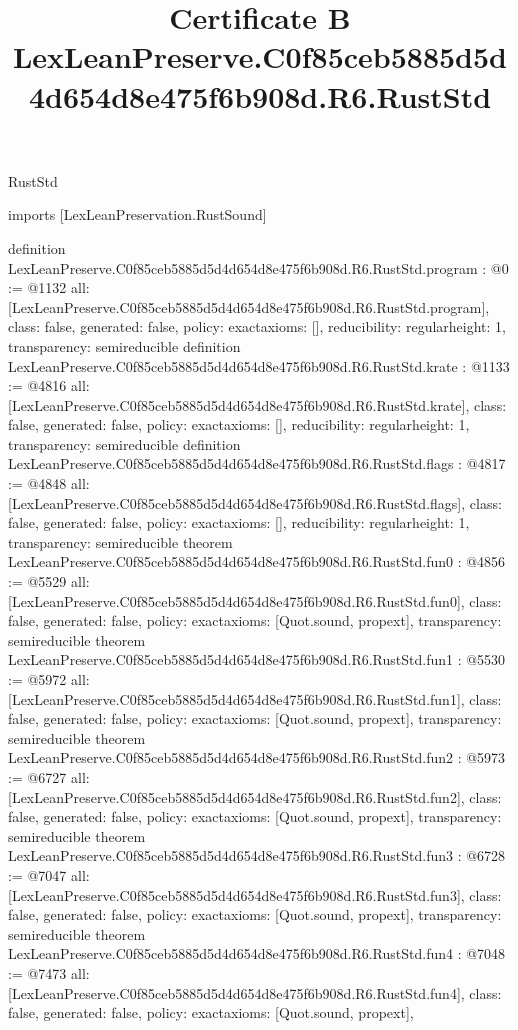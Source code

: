 \begin{lexlean}{RustStd}
\title{Certificate B LexLeanPreserve.C0f85ceb5885d5d4d654d8e475f6b908d.R6.RustStd}
\begin{coremodule}
imports [LexLeanPreservation.RustSound]

definition LexLeanPreserve.C0f85ceb5885d5d4d654d8e475f6b908d.R6.RustStd.program : @0 := @1132 {
  all: [LexLeanPreserve.C0f85ceb5885d5d4d654d8e475f6b908d.R6.RustStd.program],
  class: false,
  generated: false,
  policy: exact{axioms: []},
  reducibility: regular{height: 1},
  transparency: semireducible
}
definition LexLeanPreserve.C0f85ceb5885d5d4d654d8e475f6b908d.R6.RustStd.krate : @1133 := @4816 {
  all: [LexLeanPreserve.C0f85ceb5885d5d4d654d8e475f6b908d.R6.RustStd.krate],
  class: false,
  generated: false,
  policy: exact{axioms: []},
  reducibility: regular{height: 1},
  transparency: semireducible
}
definition LexLeanPreserve.C0f85ceb5885d5d4d654d8e475f6b908d.R6.RustStd.flags : @4817 := @4848 {
  all: [LexLeanPreserve.C0f85ceb5885d5d4d654d8e475f6b908d.R6.RustStd.flags],
  class: false,
  generated: false,
  policy: exact{axioms: []},
  reducibility: regular{height: 1},
  transparency: semireducible
}
theorem LexLeanPreserve.C0f85ceb5885d5d4d654d8e475f6b908d.R6.RustStd.fun0 : @4856 := @5529 {
  all: [LexLeanPreserve.C0f85ceb5885d5d4d654d8e475f6b908d.R6.RustStd.fun0],
  class: false,
  generated: false,
  policy: exact{axioms: [Quot.sound, propext]},
  transparency: semireducible
}
theorem LexLeanPreserve.C0f85ceb5885d5d4d654d8e475f6b908d.R6.RustStd.fun1 : @5530 := @5972 {
  all: [LexLeanPreserve.C0f85ceb5885d5d4d654d8e475f6b908d.R6.RustStd.fun1],
  class: false,
  generated: false,
  policy: exact{axioms: [Quot.sound, propext]},
  transparency: semireducible
}
theorem LexLeanPreserve.C0f85ceb5885d5d4d654d8e475f6b908d.R6.RustStd.fun2 : @5973 := @6727 {
  all: [LexLeanPreserve.C0f85ceb5885d5d4d654d8e475f6b908d.R6.RustStd.fun2],
  class: false,
  generated: false,
  policy: exact{axioms: [Quot.sound, propext]},
  transparency: semireducible
}
theorem LexLeanPreserve.C0f85ceb5885d5d4d654d8e475f6b908d.R6.RustStd.fun3 : @6728 := @7047 {
  all: [LexLeanPreserve.C0f85ceb5885d5d4d654d8e475f6b908d.R6.RustStd.fun3],
  class: false,
  generated: false,
  policy: exact{axioms: [Quot.sound, propext]},
  transparency: semireducible
}
theorem LexLeanPreserve.C0f85ceb5885d5d4d654d8e475f6b908d.R6.RustStd.fun4 : @7048 := @7473 {
  all: [LexLeanPreserve.C0f85ceb5885d5d4d654d8e475f6b908d.R6.RustStd.fun4],
  class: false,
  generated: false,
  policy: exact{axioms: [Quot.sound, propext]},
}
\end{coremodule}
\end{lexlean}
